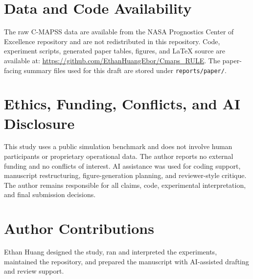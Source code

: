 \documentclass[10pt,twocolumn]{article}
\begin{document}
\section*{Data and Code Availability}

The raw C-MAPSS data are available from the NASA Prognostics Center of Excellence repository \citep{NASA_PCoE} and are not redistributed in this repository. Code, experiment scripts, generated paper tables, figures, and LaTeX source are available at: \url{https://github.com/EthanHuangEbor/Cmaps_RULE}. The paper-facing summary files used for this draft are stored under \texttt{reports/paper/}.

\section*{Ethics, Funding, Conflicts, and AI Disclosure}

This study uses a public simulation benchmark and does not involve human participants or proprietary operational data. The author reports no external funding and no conflicts of interest. AI assistance was used for coding support, manuscript restructuring, figure-generation planning, and reviewer-style critique. The author remains responsible for all claims, code, experimental interpretation, and final submission decisions.

\section*{Author Contributions}

Ethan Huang designed the study, ran and interpreted the experiments, maintained the repository, and prepared the manuscript with AI-assisted drafting and review support.



\end{document}
